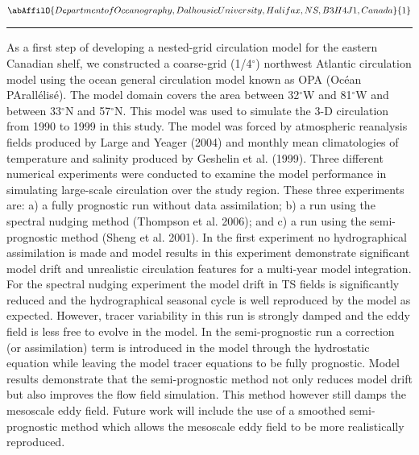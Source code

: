 \begin{minipage}{\linewidth}\begin{center}\begin{minipage}{\linewidth}
   \vspace{2 mm} \begin{center}
    \vspace{2 mm}\begin{center}
  
  $\abAffilO{Department of Oceanography, Dalhousie University, Halifax, NS, B3H 4J1, Canada}{1}$

  \end{center}
  \vspace{2 mm}
  \end{center}\end{minipage}\end{center}
  \begin{center}\rule{0.70\linewidth}{0.5 pt}\end{center}
  \begin{minipage}{\linewidth}
\noindent As a first step of developing a nested-grid circulation model for the eastern Canadian shelf, we constructed a coarse-grid (1/4$^\circ$) northwest Atlantic circulation model using the ocean general circulation model known as OPA (Oc\'{e}an PArall\'{e}lis\'{e}). The model domain covers the area between 32$^\circ$W and 81$^\circ$W and between 33$^\circ$N and 57$^\circ$N. This model was used to simulate the 3-D circulation from 1990 to 1999 in this study. The model was forced by atmospheric reanalysis fields produced by Large and Yeager (2004) and monthly mean climatologies of temperature and salinity produced by Geshelin et al. (1999). Three different numerical experiments were conducted to examine the model performance in simulating large-scale circulation over the study region. These three experiments are: a) a fully prognostic run without data assimilation; b) a run using the spectral nudging method (Thompson et al. 2006); and c) a run using the semi-prognostic method (Sheng et al. 2001). In the first experiment no hydrographical assimilation is made and model results in this experiment demonstrate significant model drift and unrealistic circulation features for a multi-year model integration. For the spectral nudging experiment the model drift in TS fields is significantly reduced and the hydrographical seasonal cycle is well reproduced by the model as expected. However, tracer variability in this run is strongly damped and the eddy field is less free to evolve in the model. In the semi-prognostic run a correction (or assimilation) term is introduced in the model through the hydrostatic equation while leaving the model tracer equations to be fully prognostic. Model results demonstrate that the semi-prognostic method not only reduces model drift but also improves the flow field simulation. This method however still damps the mesoscale eddy field. Future work will include the use of a smoothed semi-prognostic method which allows the mesoscale eddy field to be more realistically reproduced.

\end{minipage}
\end{minipage}
